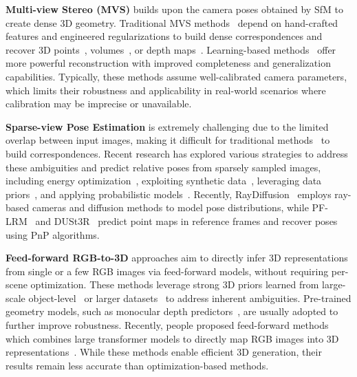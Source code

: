 \textbf{Multi-view Stereo (MVS)} builds upon the camera poses obtained by SfM to create dense 3D geometry. Traditional MVS methods~\cite{hirschmuller2007stereo, schoenberger2016mvs, galliani2015massively, furukawa2015multi} depend on hand-crafted features and engineered regularizations to build dense correspondences and recover 3D points~\cite{lhuillier2005quasi, furukawa2009accurate}, volumes~\cite{kutulakos2000theory, seitz1999photorealistic, furukawa2009accurate}, or depth maps~\cite{campbell2008using, tola2012efficient, galliani2015massively}. Learning-based methods~\cite{yao2018mvsnet, yao2019recurrent, chen2019point, gu2020cascade, zhang2023vis} offer more powerful reconstruction with improved completeness and generalization capabilities. Typically, these methods assume well-calibrated camera parameters, which limits their robustness and applicability in real-world scenarios where calibration may be imprecise or unavailable.

\textbf{Sparse-view Pose Estimation} is extremely challenging due to the limited overlap between input images, making it difficult for traditional methods~\cite{snavely2006photo, mur2015orb} to build correspondences. Recent research has explored various strategies to address these ambiguities and predict relative poses from sparsely sampled images, including energy optimization~\cite{lin2023relpose++, sinha2023sparsepose}, exploiting synthetic data~\cite{jiang2024few}, leveraging data priors~\cite{wang2023posediffusion}, and applying probabilistic models~\cite{chen2021wide, zhang2022relpose}. Recently, RayDiffusion~\cite{zhang2024cameras} employs ray-based cameras and diffusion methods to model pose distributions, while PF-LRM~\cite{wang2023pf} and DUSt3R~\cite{wang2024dust3r} predict point maps in reference frames and recover poses using PnP algorithms.

\textbf{Feed-forward RGB-to-3D} approaches aim to directly infer 3D representations from single or a few RGB images via feed-forward models, without requiring per-scene optimization. These methods leverage strong 3D priors learned from large-scale object-level~\cite{chang2015shapenet} or larger datasets~\cite{deitke2023objaverse} to address inherent ambiguities. Pre-trained geometry models, such as monocular depth predictors~\cite{ranftl2021vision, bian2021auto, yin2021learning, Ranftl2022}, are usually adopted to further improve robustness. Recently, people proposed feed-forward methods~\cite{hong2023lrm, li2023instant3d, xu2023dmv3d, zhang2024gs, tang2024lgm, wu2024direct3d} which combines large transformer models to directly map RGB images into 3D representations~\cite{Chan2022Efficient, gao2024relightable, lin2024gaussian}. While these methods enable efficient 3D generation, their results remain less accurate than optimization-based methods.

